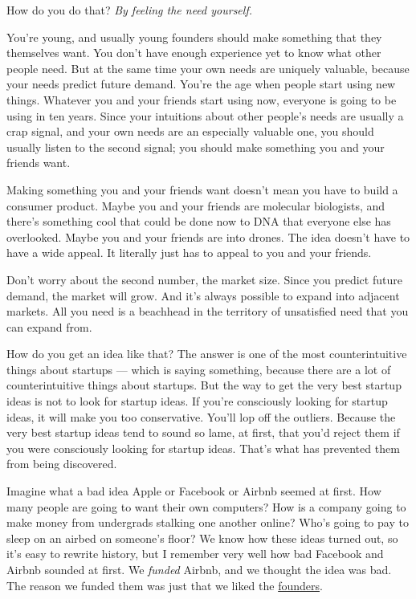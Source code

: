 How do you do that? \emph{By feeling the need yourself.}

You're young, and usually young founders should make something that they
themselves want. You don't have enough experience yet to know what other
people need. But at the same time your own needs are uniquely valuable,
because your needs predict future demand. You're the age when people
start using new things. Whatever you and your friends start using now,
everyone is going to be using in ten years. Since your intuitions about
other people's needs are usually a crap signal, and your own needs are
an especially valuable one, you should usually listen to the second
signal; you should make something you and your friends want.

Making something you and your friends want doesn't mean you have to
build a consumer product. Maybe you and your friends are molecular
biologists, and there's something cool that could be done now to DNA
that everyone else has overlooked. Maybe you and your friends are into
drones. The idea doesn't have to have a wide appeal. It literally just
has to appeal to you and your friends.

Don't worry about the second number, the market size. Since you predict
future demand, the market will grow. And it's always possible to expand
into adjacent markets. All you need is a beachhead in the territory of
unsatisfied need that you can expand from.

How do you get an idea like that? The answer is one of the most
counterintuitive things about startups --- which is saying something,
because there are a lot of counterintuitive things about startups. But
the way to get the very best startup ideas is not to look for startup
ideas. If you're consciously looking for startup ideas, it will make you
too conservative. You'll lop off the outliers. Because the very best
startup ideas tend to sound so lame, at first, that you'd reject them if
you were consciously looking for startup ideas. That's what has
prevented them from being discovered.

Imagine what a bad idea Apple or Facebook or Airbnb seemed at first. How
many people are going to want their own computers? How is a company
going to make money from undergrads stalking one another online? Who's
going to pay to sleep on an airbed on someone's floor? We know how these
ideas turned out, so it's easy to rewrite history, but I remember very
well how bad Facebook and Airbnb sounded at first. We \emph{funded}
Airbnb, and we thought the idea was bad. The reason we funded them was
just that we liked the \href{airbnbs.html}{founders}.

